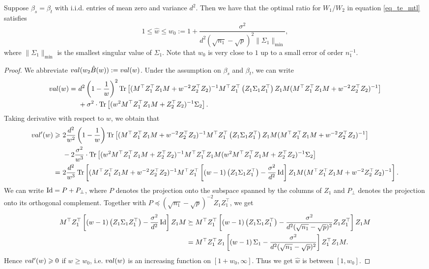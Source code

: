 {\color{blue}
\begin{proposition}
	Suppose $\beta_s = \beta_t$ with i.i.d. entries of mean zero and variance $d^2$. Then we have that the optimal ratio for $W_1/W_2$ in equation \eqref{eq_te_mtl} satisfies
	$$1\le \hat{w} \le w_0:=1 + \frac{\sigma^2}{d^2(\sqrt{n_1}-\sqrt{p})^2 \|\Sigma_1\|_{\min}},$$
	where $\|\Sigma_1\|_{\min}$ is the smallest singular value of $\Sigma_1$. Note that $w_0$ is very close to $1$ up to a small error of order $n_1^{-1}$.
\end{proposition}
\begin{proof}
We abbreviate $val(w_2\hat{B}(w)):=val(w)$. Under the assumption on $\beta_s$ and $\beta_t$, we can write
\begin{align}
	val(w) =&~ d^2 \left( 1-\frac1w\right)^2 \operatorname{Tr}\left[( M^\top Z_1^{\top}Z_1 M + w^{-2}Z_2^{\top}Z_2)^{-1} M^\top Z_1^{\top}\left(Z_1 \Sigma_1 Z_1^{\top}\right) Z_1 M ( M^\top Z_1^{\top}Z_1 M + w^{-2}Z_2^{\top}Z_2)^{-1}\right] \nonumber \\
			&~ + \sigma^2 \cdot \operatorname{Tr}\left[(w^2 M^\top Z_1^{\top}Z_1 M + Z_2^{\top}Z_2)^{-1} \Sigma_2\right].  \nonumber
\end{align}
Taking derivative with respect to $w$, we obtain that
\begin{align*}
val'(w) \geqslant &~ 2\frac{d^2}{w^2} \left( 1-\frac1w\right) \operatorname{Tr}\left[( M^\top Z_1^{\top}Z_1 M + w^{-2}Z_2^{\top}Z_2)^{-1} M^\top Z_1^{\top}\left(Z_1 \Sigma_1 Z_1^{\top}\right) Z_1 M ( M^\top Z_1^{\top}Z_1 M + w^{-2}Z_2^{\top}Z_2)^{-1}\right]   \\
			&~ - 2 \frac{\sigma^2}{w^3} \cdot \operatorname{Tr}\left[(w^2 M^\top Z_1^{\top}Z_1 M + Z_2^{\top}Z_2)^{-1} M^\top Z_1^{\top}Z_1 M (w^2 M^\top Z_1^{\top}Z_1 M + Z_2^{\top}Z_2)^{-1}\Sigma_2\right] \\
			=& ~ 2\frac{d^2}{w^3} \operatorname{Tr}\left[( M^\top Z_1^{\top}Z_1 M + w^{-2}Z_2^{\top}Z_2)^{-1} M^\top Z_1^{\top} \left[\left( w-1\right)\left(Z_1 \Sigma_1 Z_1^{\top}\right) - \frac{\sigma^2}{d^2}\operatorname{Id} \right] Z_1 M ( M^\top Z_1^{\top}Z_1 M + w^{-2}Z_2^{\top}Z_2)^{-1}\right]  .
\end{align*}
We can write $\operatorname{Id} = P+ P_{\perp}$, where $P$ denotes the projection onto the subspace spanned by the columns of $Z_1$ and $P_{\perp}$ denotes the projection onto its orthogonal complement. Together with $P\preceq (\sqrt{n_1}-\sqrt{p})^{-2} Z_1 Z_1^\top$, we get
\begin{align*}
M^\top Z_1^{\top} \left[\left( w-1\right)\left(Z_1 \Sigma_1 Z_1^{\top}\right) - \frac{\sigma^2}{d^2}\operatorname{Id} \right] Z_1 M  &\succeq M^\top Z_1^{\top} \left[\left( w-1\right)\left(Z_1 \Sigma_1 Z_1^{\top}\right) - \frac{\sigma^2}{d^2(\sqrt{n_1}-\sqrt{p})^{2}} Z_1 Z_1^\top \right] Z_1 M  \\
&= M^\top Z_1^{\top}Z_1  \left[\left( w-1\right) \Sigma_1  - \frac{\sigma^2}{d^2(\sqrt{n_1}-\sqrt{p})^{2}} \right] Z_1^\top Z_1 M .
\end{align*}
Hence $val'(w)\geqslant 0$ if $w\ge w_0$, i.e. $val(w)$ is an increasing function on $[1+w_0,\infty]$. Thus we get $\hat w$ is between $[1,w_0]$.
\end{proof}
}

